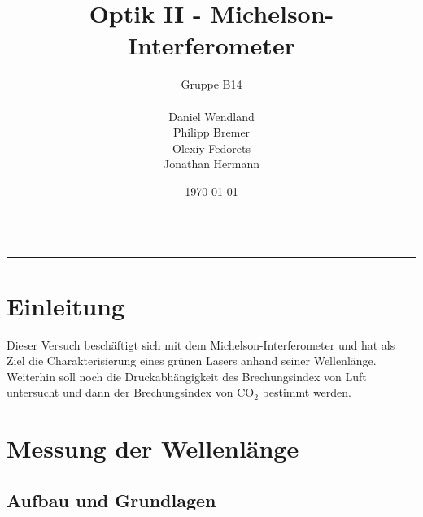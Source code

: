 \documentclass[a4paper, 11pt]{article}
\title{Optik II - Michelson-Interferometer}
\author{Gruppe B14 \\ \\ Daniel Wendland \\ Philipp Bremer \\ Olexiy Fedorets \\ Jonathan Hermann}
\date{\today}
\begin{document}
\begin{titlepage}
	\vspace*{\fill}
	\begin{center}
		\textheight
		\vfill
		\newcommand{\Line}{\rule{\linewidth}{0.6mm}}
		\Line 
		{\let\newpage\relax\maketitle}
		\Line 
		\vfill
	\end{center}

	
	\vspace*{\fill}
	\thispagestyle{empty}
\end{titlepage}





\newpage
\thispagestyle{empty}
\tableofcontents
\newpage

\pagestyle{fancy}
\fancyhf{}
\fancyhead[L]{\nouppercase{\leftmark}}
\fancyhead[R]{\thepage}
\renewcommand{\headrulewidth}{0.5pt}
\fancyfoot[C]{\thepage}


\setcounter{page}{1}

\section{Einleitung}
Dieser Versuch beschäftigt sich mit dem Michelson-Interferometer und hat als Ziel die Charakterisierung eines grünen Lasers anhand seiner Wellenlänge. Weiterhin soll noch die Druckabhängigkeit des Brechungsindex von Luft untersucht und dann der Brechungsindex von $\mathrm{CO_2}$ bestimmt werden.


\section{Messung der Wellenlänge}

\subsection{Aufbau und Grundlagen} 
\end{document}
